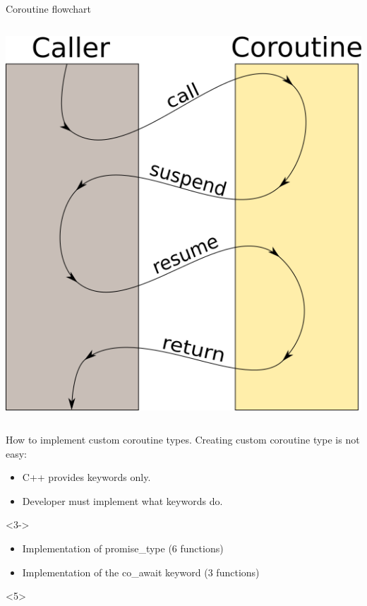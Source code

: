 \documentclass[10pt]{beamer}
\begin{document}
\begin{frame}{Coroutine flowchart}
\begin{columns}
\begin{column}{0.48\linewidth}
  \includegraphics[width=0.8\linewidth]{graphics/coroutine-workflow.png}
\end{column}

\end{columns}

\end{frame}

\begin{frame}{How to implement custom coroutine types.}
	Creating custom coroutine type is not easy:
	\begin{itemize}[<+->]
		\item C++ provides keywords \alert{only}.
		\item \alert{Developer must implement} what keywords do.
	\end{itemize}

	\vfill

	<3->
	\begin{itemize}[<+->]
		\item Implementation of promise\_type ({\selectfont\texttildelow}6 functions)
		\item Implementation of the co\_await  keyword ({\selectfont\texttildelow}3 functions)
	\end{itemize}

	\vfill

\end{frame}
\end{document}
